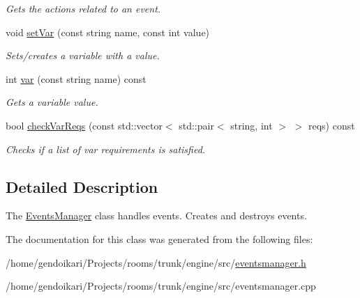 \begin{DoxyCompactItemize}
\begin{DoxyCompactList}\small\item\em Gets the actions related to an event. \item\end{DoxyCompactList}\item 
\hypertarget{classEventsManager_a58656778b67fa37e238ff0c60c91e803}{
void \hyperlink{classEventsManager_a58656778b67fa37e238ff0c60c91e803}{setVar} (const string name, const int value)}
\label{classEventsManager_a58656778b67fa37e238ff0c60c91e803}

\begin{DoxyCompactList}\small\item\em Sets/creates a variable with a value. \item\end{DoxyCompactList}\item 
\hypertarget{classEventsManager_ad92087b0dba0e5316202497697af64d6}{
int \hyperlink{classEventsManager_ad92087b0dba0e5316202497697af64d6}{var} (const string name) const }
\label{classEventsManager_ad92087b0dba0e5316202497697af64d6}

\begin{DoxyCompactList}\small\item\em Gets a variable value. \item\end{DoxyCompactList}\item 
\hypertarget{classEventsManager_a3a46c7e9ef1c8c62ad0c550d50ac4acd}{
bool \hyperlink{classEventsManager_a3a46c7e9ef1c8c62ad0c550d50ac4acd}{checkVarReqs} (const std::vector$<$ std::pair$<$ string, int $>$ $>$ reqs) const }
\label{classEventsManager_a3a46c7e9ef1c8c62ad0c550d50ac4acd}

\begin{DoxyCompactList}\small\item\em Checks if a list of var requirements is satisfied. \item\end{DoxyCompactList}\end{DoxyCompactItemize}


\subsection{Detailed Description}
The \hyperlink{classEventsManager}{EventsManager} class handles events. Creates and destroys events. 

The documentation for this class was generated from the following files:\begin{DoxyCompactItemize}
\item 
/home/gendoikari/Projects/rooms/trunk/engine/src/\hyperlink{eventsmanager_8h}{eventsmanager.h}\item 
/home/gendoikari/Projects/rooms/trunk/engine/src/eventsmanager.cpp\end{DoxyCompactItemize}
